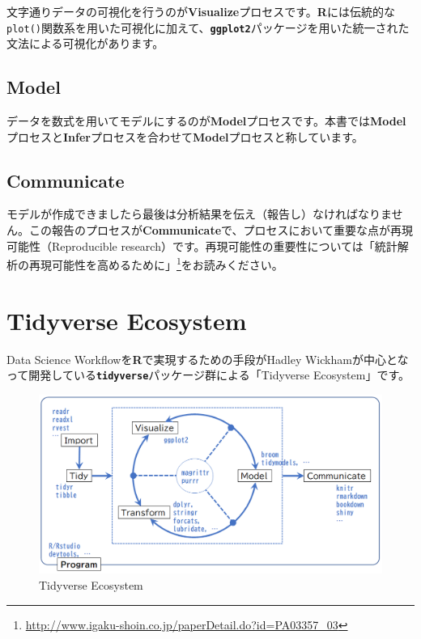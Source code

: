 \documentclass[
  12pt,
]{book}
\DeclareRobustCommand{\href}[2]{#2\footnote{\url{#1}}}
\begin{document}
文字通りデータの可視化を行うのが\textbf{Visualize}プロセスです。\textbf{R}には伝統的な\texttt{plot()}関数系を用いた可視化に加えて、\textbf{\texttt{ggplot2}}パッケージを用いた統一された文法による可視化があります。

\hypertarget{model}{%
\subsection*{Model}\label{model}}

データを数式を用いてモデルにするのが\textbf{Model}プロセスです。本書では\textbf{Model}プロセスと\textbf{Infer}プロセスを合わせて\textbf{Model}プロセスと称しています。

\hypertarget{communicate}{%
\subsection*{Communicate}\label{communicate}}

モデルが作成できましたら最後は分析結果を伝え（報告し）なければなりません。この報告のプロセスが\textbf{Communicate}で、プロセスにおいて重要な点が再現可能性（Reproducible research）です。再現可能性の重要性については\href{http://www.igaku-shoin.co.jp/paperDetail.do?id=PA03357_03}{「統計解析の再現可能性を高めるために」}をお読みください。

\hypertarget{tidyverse-ecosystem}{%
\section*{Tidyverse Ecosystem}\label{tidyverse-ecosystem}}

Data Science Workflowを\textbf{R}で実現するための手段がHadley Wickhamが中心となって開発している\textbf{\texttt{tidyverse}}パッケージ群による「Tidyverse Ecosystem」です。

\begin{figure}[H]

{\centering \includegraphics[width=0.85\linewidth,]{./fig/DSWF/tidyverse_eco_system} 

}

\caption{Tidyverse Ecosystem}\label{fig:unnamed-chunk-14}
\end{figure}
\end{document}
